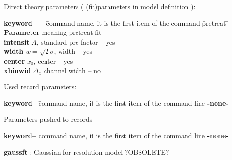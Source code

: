 \documentclass[11pt,fleqn]{book} %
\newcommand{\linespace}{\vspace{4ex}}
\newcommand{\expl}[1]{\hskip 0.5cm {\color{explgray} #1}}
\begin{document}
Direct theory parameters ( (fit)parameters in model definition ):
\begin{tabbing}
\textbf{keyword-----}  \= command name, it is the first item of the command \= pretreat   \=   \kill
\textbf{Parameter}  \> meaning                                           \> pretreat   \> fit      \\
\textbf{intensit  } \>  $A$, standard pre factor                          \>  --        \> yes      \\         
\textbf{width     } \>  $w = \sqrt{2} \sigma$, width                     \> --        \> yes      \\
\textbf{center    } \>  $x_0$, center                                    \> --        \> yes       \\
\textbf{xbinwid   } \>  $\Delta_x$ channel width                         \> --        \> no       \\
\end{tabbing}

\linespace
Used record parameters: 
\begin{tabbing}
\textbf{keyword--}  \= command name, it is the first item of the command line                    \kill
\textbf{-none-   } \>            \\         
\end{tabbing}

\linespace
Parameters pushed to records:
\begin{tabbing}
\textbf{keyword--}  \= command name, it is the first item of the command line                    \kill
\textbf{-none-  } \>            \\         
\end{tabbing}

\linespace

\begin{exercise}
\textbf{gaussft} : \expl{Gaussian for resolution model ?OBSOLETE?}\\
\end{exercise}
\end{document}
